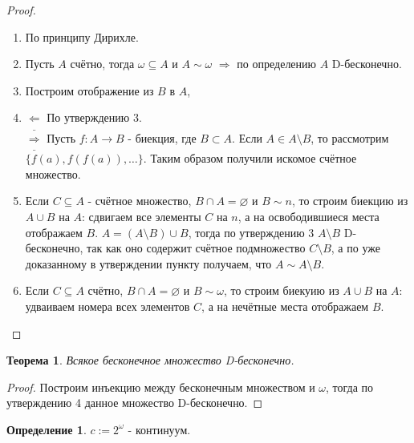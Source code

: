 \documentclass[a4paper, 12pt]{article}
\theoremstyle{definition}
\newtheorem*{definition}{Определение}
\theoremstyle{plain}
\newtheorem*{theorem}{Теорема}
\theoremstyle{remark}
\begin{document}
  \begin{proof}
    \begin{enumerate}
      \item По принципу Дирихле.
      \item Пусть $A$ счётно, тогда $\omega\subseteq A$ и $A\sim\omega$ $\Longrightarrow$ по определению $A$ D-бесконечно.
      \item Построим отображение из $B$ в $A$,
      \item $\underline{\Longleftarrow}$ По утверждению 3.\\
      $\underline{\Longrightarrow}$ Пусть $f:A\to B$ - биекция, где $B\subset A$. Если $A\in A\setminus B$, то рассмотрим $\{f(a),f(f(a)),\ldots\}$. Таким образом получили искомое счётное множество.
      \item Если $C\subseteq A$ - счётное множество, $B\cap A=\varnothing$ и $B\sim n$, то строим биекцию из $A\cup B$ на $A$: сдвигаем все элементы $C$ на $n$, а на освободившиеся места отображаем $B$. $A=(A\setminus B)\cup B$, тогда по утверждению 3 $A\setminus B$ D-бесконечно, так как оно содержит счётное подмножество $C\setminus B$, а по уже доказанному в утверждении пункту получаем, что $A\sim A\setminus B$.
      \item Если $C\subseteq A$ счётно, $B\cap A=\varnothing$ и $B\sim\omega$, то строим биекуию из $A\cup B$ на $A$: удваиваем номера всех элементов $C$, а на нечётные места отображаем $B$.
    \end{enumerate}
  \end{proof}
  \begin{theorem}
    Всякое бесконечное множество D-бесконечно.
  \end{theorem}
  \begin{proof}
    Построим инъекцию между бесконечным множеством и $\omega$, тогда по утверждению 4 данное множество D-бесконечно.
  \end{proof}
  \begin{definition}
    $c:=2^{\omega}$ - континуум.
  \end{definition}
\end{document}
